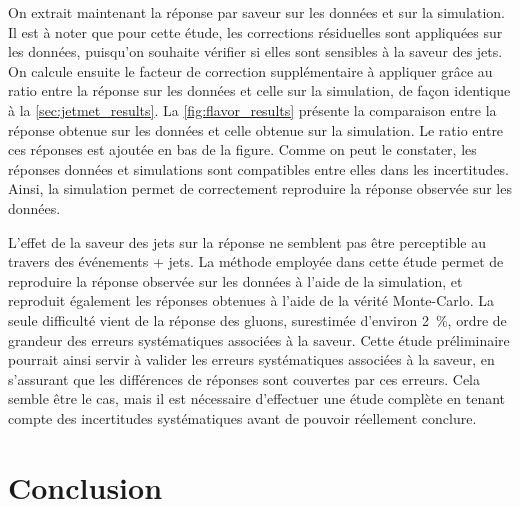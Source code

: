 On extrait maintenant la réponse par saveur sur les données et sur la simulation. Il est à noter que pour cette étude, les corrections résiduelles sont appliquées sur les données, puisqu'on souhaite vérifier si elles sont sensibles à la saveur des jets. On calcule ensuite le facteur de correction supplémentaire à appliquer grâce au ratio entre la réponse sur les données et celle sur la simulation, de façon identique à la \cref{sec:jetmet_results}. La \cref{fig:flavor_results} présente la comparaison entre la réponse obtenue sur les données et celle obtenue sur la simulation. Le ratio entre ces réponses est ajoutée en bas de la figure. Comme on peut le constater, les réponses données et simulations sont compatibles entre elles dans les incertitudes. Ainsi, la simulation permet de correctement reproduire la réponse observée sur les données.

\bigskip


L'effet de la saveur des jets sur la réponse ne semblent pas être perceptible au travers des événements \Pgamma + jets. La méthode employée dans cette étude permet de reproduire la réponse observée sur les données à l'aide de la simulation, et reproduit également les réponses obtenues à l'aide de la vérité Monte-Carlo. La seule difficulté vient de la réponse des gluons, surestimée d'environ \tilde\SI{2}{\percent}, ordre de grandeur des erreurs systématiques associées à la saveur. Cette étude préliminaire pourrait ainsi servir à valider les erreurs systématiques associées à la saveur, en s'assurant que les différences de réponses sont couvertes par ces erreurs. Cela semble être le cas, mais il est nécessaire d'effectuer une étude complète en tenant compte des incertitudes systématiques avant de pouvoir réellement conclure.

\section{Conclusion}

